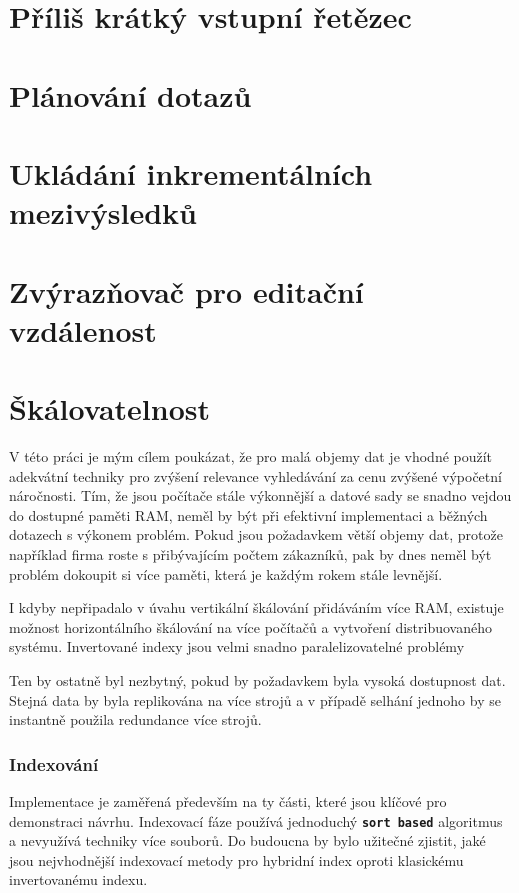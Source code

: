 \documentclass[11pt,letterpaper,oneside,openright]{book}
\newcommand{\bftt}[1]{\texttt{\textbf{#1}}}
\begin{document}
\section{Příliš krátký vstupní řetězec}
\section{Plánování dotazů}
\section{Ukládání inkrementálních mezivýsledků}
\section{Zvýrazňovač pro editační vzdálenost}
\section{Škálovatelnost}
V této práci je mým cílem poukázat, že pro malá objemy dat je vhodné použít
adekvátní techniky pro zvýšení relevance vyhledávání za cenu zvýšené výpočetní
náročnosti. Tím, že jsou počítače stále výkonnější a datové sady se snadno
vejdou do dostupné paměti RAM, neměl by být při efektivní implementaci a
běžných dotazech s výkonem problém. Pokud jsou požadavkem větší objemy dat,
protože například firma roste s přibývajícím počtem zákazníků, pak by dnes
neměl být problém dokoupit si více paměti, která je každým rokem stále levnější.

I kdyby nepřipadalo v úvahu vertikální škálování přidáváním více RAM, existuje
možnost horizontálního škálování na více počítačů a vytvoření distribuovaného
systému. Invertované indexy jsou velmi snadno paralelizovatelné problémy

Ten by ostatně byl nezbytný, pokud by požadavkem byla vysoká
dostupnost dat. Stejná data by byla replikována na více strojů a v případě
selhání jednoho by se instantně použila redundance více strojů.



\subsubsection{Indexování}
Implementace je zaměřená především na ty části, které jsou klíčové pro
demonstraci návrhu. Indexovací fáze používá jednoduchý \bftt{sort based}
algoritmus a nevyužívá techniky více souborů. Do budoucna by bylo užitečné
zjistit, jaké jsou nejvhodnější indexovací metody pro hybridní index oproti
klasickému invertovanému indexu.
\end{document}
